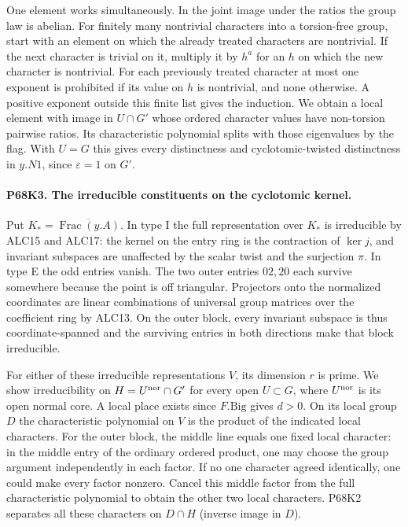 One element works simultaneously. In the joint image under the
ratios the group law is abelian. For finitely many nontrivial
characters into a torsion-free group, start with an element on
which the already treated characters are nontrivial. If the next
character is trivial on it, multiply it by $h^a$ for an $h$
on which the new character is nontrivial. For each previously
treated character at most one exponent is prohibited if its
value on $h$ is nontrivial, and none otherwise. A positive
exponent outside this finite list gives the induction. We obtain
a local element with image in $U\cap G'$ whose ordered character
values have non-torsion pairwise ratios. Its characteristic
polynomial splits with those eigenvalues by the flag. With
$U=G$ this gives every distinctness and cyclotomic-twisted
distinctness in $y.N1$, since $\varepsilon=1$ on $G'$.

\paragraph{P68K3. The irreducible constituents on the cyclotomic kernel.}
Put $K_*=\overline{\operatorname{Frac}(y.A)}$. In type I the
full representation over $K_*$ is irreducible by ALC15 and
ALC17: the kernel on the entry ring is the contraction of
$\ker j$, and invariant subspaces are unaffected by the scalar
twist and the surjection $\pi$. In type E the odd entries vanish.
The two outer entries $02,20$ each survive somewhere because
the point is off triangular. Projectors onto the normalized
coordinates are linear combinations of universal group matrices
over the coefficient ring by ALC13. On the outer block,
every invariant subspace is thus coordinate-spanned and the
surviving entries in both directions make that block irreducible.

For either of these irreducible representations $V$, its dimension
$r$ is prime. We show irreducibility on $H=U^{\rm nor}\cap G'$
for every open $U\subset G$, where $U^{\rm nor}$ is its open
normal core. A local place exists since $F.\mathrm{Big}$ gives
$d>0$. On its local group $D$ the characteristic polynomial on
$V$ is the product of the indicated local characters. For the
outer block, the middle line equals one fixed local character:
in the middle entry of the ordinary ordered product, one may
choose the group argument independently in each factor. If no
one character agreed identically, one could make every factor
nonzero. Cancel this middle factor from the full characteristic
polynomial to obtain the other two local characters. P68K2
separates all these characters on $D\cap H$ (inverse image in $D$).

